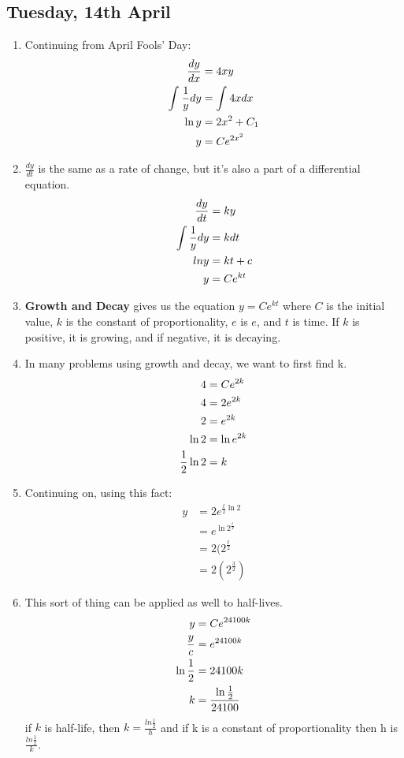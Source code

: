 \documentclass[11pt]{article}
\begin{document}
\subsection{Tuesday, 14th April}
\begin{enumerate}
	\item Continuing from April Fools' Day:
		\begin{align}
			\setcounter{equation}{0}
			\frac{dy}{dx} &= 4xy \\
			\int_{}^{}\frac{1}{y}dy &= \int_{}^{}4xdx \\
			\ln y &= 2x^2+C_1 \\
			y &= Ce^{2x^2}
		\end{align}
	\item $\frac{dy}{dt}$ is the same as a rate of change, but it's also a part
		of a differential equation.
		\begin{align}
			\setcounter{equation}{0}
			\frac{dy}{dt} &= ky \\
			\int \frac{1}{y}dy &= kdt \\
			ln y &= kt+c \\
			y &= Ce^{kt}
		\end{align}
	\item {\bf Growth and Decay} gives us the equation $y = Ce^{kt}$ where 
		$C$ is the initial value, $k$ is the constant of proportionality, $e$ is
		$e$, and $t$ is time.  If $k$ is positive, it is growing, and if negative,
		it is decaying.
	\item In many problems using growth and decay, we want to first find k.
		\begin{align}
			\setcounter{equation}{0}
			4 &= Ce^{2k}\\
			4 &= 2e^{2k}\\
			2 &= e^{2k} \\
			\ln 2 &= \ln e^{2k} \\
			\frac{1}{2} \ln 2 &= k
		\end{align}
	\item Continuing on, using this fact:
		\begin{align}
			y &= 2e^{\frac{t}{2}\ln 2}\\
				&= e^{\ln 2^{\frac{t}{2}}} \\
				&= 2(2^{\frac{t}{2}} \\
				&= 2(2^{\frac{3}{2}})
		\end{align}
	\item This sort of thing can be applied as well to half-lives.
		\begin{align}
			\setcounter{equation}{0}
			y &= Ce^{24100k} \\
			\frac{y}{c} &= e^{24100k} \\
			\ln \frac{1}{2} &= 24100k \\
			k &= \frac{\ln \frac{1}{2}}{24100}
		\end{align}
		if $k$ is half-life, then $k=\frac{ln\frac{1}{2}}{h}$ and if k is a
		constant of proportionality then h is $\frac{ln\frac{1}{2}}{k}$.
\end{enumerate}
\end{document}
